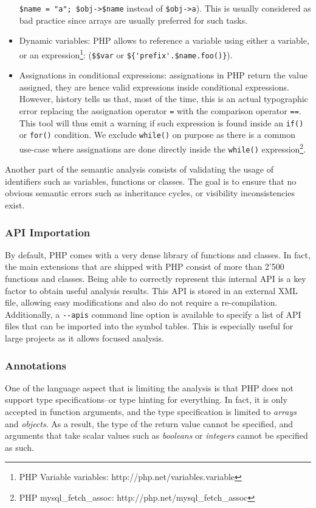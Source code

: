 \documentclass[a4paper]{article}
\begin{document}
\begin{itemize}
    \verb.$name = "a"; $obj->$name. instead of \verb.$obj->a.). This is usually
    considered as bad practice since arrays are usually preferred for such
    tasks.
  \item Dynamic variables: PHP allows to reference a variable using either a
    variable, or an expression\footnote{PHP Variable variables:
    http://php.net/variables.variable}: (\verb=$$var= or
    \verb=${'prefix'.$name.foo()}=).
  \item Assignations in conditional expressions: assignations in PHP return the
    value assigned, they are hence valid expressions inside conditional
    expressions. However, history tells us that, most of the time, this is an
    actual typographic error replacing the assignation operator \verb&=& with
    the comparison operator \verb&==&. This tool will thus emit a warning if
    such expression is found inside an \verb&if()& or \verb&for()& condition.
    We exclude \verb&while()& on purpose as there is a common use-case where
    assignations are done directly inside the \verb&while()&
    expression\footnote{PHP mysql\_fetch\_assoc:
    http://php.net/mysql\_fetch\_assoc}.
\end{itemize}

Another part of the semantic analysis consists of validating the usage of
identifiers such as variables, functions or classes. The goal is to ensure that
no obvious semantic errors such as inheritance cycles, or visibility
inconsistencies exist.

\subsubsection{API Importation}
By default, PHP comes with a very dense library of functions and classes. In
fact, the main extensions that are shipped with PHP consist of more than 2'500
functions and classes. Being able to correctly represent this internal API is a
key factor to obtain useful analysis results. This API is stored in an external
XML file, allowing easy modifications and also do not require a re-compilation.
Additionally, a \verb=--apis= command line option is available to specify a
list of API files that can be imported into the symbol tables. This is
especially useful for large projects as it allows focused analysis.

\subsubsection{Annotations}
One of the language aspect that is limiting the analysis is that PHP does
not support type specifications--or type hinting for everything. In fact, it
is only accepted in function arguments, and the type specification is limited
to \emph{arrays} and \emph{objects}. As a result, the type of the return value
cannot be specified, and arguments that take scalar values such as
\emph{booleans} or \emph{integers} cannot be specified as such.
\end{document}
